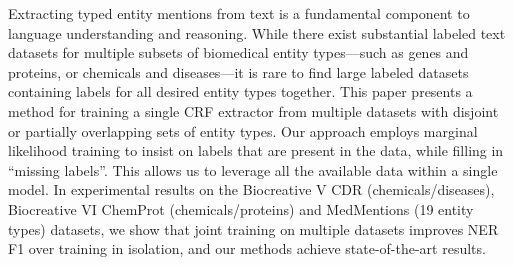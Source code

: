 Extracting typed entity mentions from text is a fundamental component to language understanding and reasoning. While there exist substantial labeled text datasets for multiple subsets of biomedical entity types—such as genes and proteins, or chemicals and diseases—it is rare to find large labeled datasets containing labels for all desired entity types together. This paper presents a method for training a single CRF extractor from multiple datasets with disjoint or partially overlapping sets of entity types. Our approach employs marginal likelihood training to insist on labels that are present in the data, while filling in ``missing labels''. This allows us to leverage all the available data within a single model. In experimental results on the Biocreative V CDR (chemicals/diseases), Biocreative VI ChemProt (chemicals/proteins) and MedMentions (19 entity types) datasets, we show that joint training on multiple datasets improves NER F1 over training in isolation, and our methods achieve state-of-the-art results.
